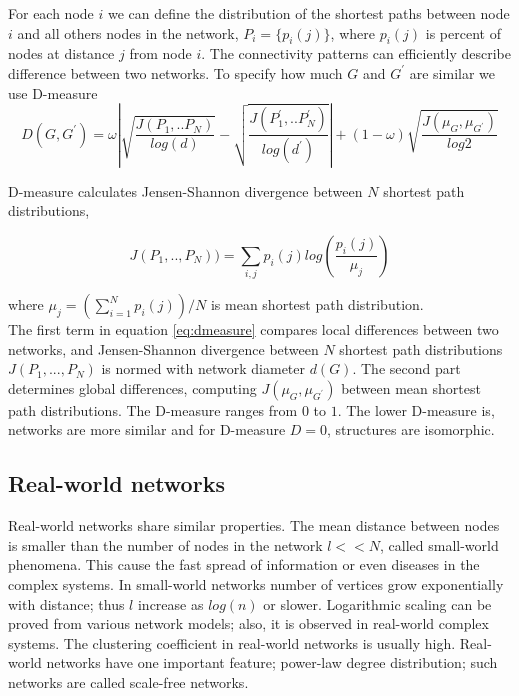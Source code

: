 
For each node $i$ we can define the distribution of the shortest paths between node $i$ and all others nodes in the network, $P_{i}=\{p_{i}(j)\}$, where $p_{i}(j)$ is percent of nodes at distance $j$ from node $i$. The connectivity patterns can efficiently describe difference between two networks.    
To specify how much $G$ and $G^{'}$ are similar we use D-measure \cite{tiago2}
\begin{equation}
D(G, G^{'}) = \omega \left| \sqrt{\frac{J(P_1,..P_N)}{log(d)}}-\sqrt{\frac{J(P_1^{'},..P_N^{'})}{log(d^{'})}} \right| + (1-\omega) \sqrt{\frac{J(\mu_{G},\mu_{G^{'}})}{log2}}
\label{eq:dmeasure}
\end{equation}

D-measure calculates Jensen-Shannon divergence between $N$ shortest path distributions,

\begin{equation}
J(P_1,.., P_N)) = \sum_{i,j}p_i(j)log(\frac{p_i(j)}{\mu_j})
\end{equation}

where  $\mu_j = (\sum_{i=1}^N p_i(j))/N$ is mean shortest path distribution. \\


The first term in equation \ref{eq:dmeasure} compares local differences between two networks, and Jensen-Shannon divergence between $N$ shortest path distributions $J(P_{1},...,P_{N})$ is normed with network diameter $d(G)$. The second part determines global differences, computing  ${J(\mu_{G},\mu_{G^{'}})}$ between mean shortest path distributions. 
The D-measure ranges from $0$ to $1$. The lower D-measure is, networks are more similar and for D-measure $D = 0$, structures are isomorphic.




\subsection{Real-world networks}
Real-world networks share similar properties. The mean distance between nodes is smaller than the number of nodes in the network $l << N$, called small-world phenomena. This cause the fast spread of information or even diseases in the complex systems. In small-world networks number of vertices grow exponentially with distance; thus $l$ increase as $log(n)$ or slower. Logarithmic scaling can be proved from various network models; also, it is observed in real-world complex systems. The clustering coefficient in real-world networks is usually high. Real-world networks have one important feature; power-law degree distribution; such networks are called scale-free networks.

